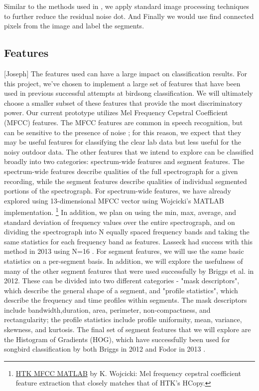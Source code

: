 \documentclass{article} %
\begin{document}
Similar to the methods used in \cite{Lasseck13}, we apply standard image processing techniques to further reduce the residual noise dot. And Finally we would use find connected pixels from the image and label the segments.

\subsection{Features}

[Joseph]  The features used can have a large impact on classification results. For this project, we've chosen to implement a
large set of features that have been used in previous successful attempts at birdsong classification. We will ultimately
choose a smaller subset of these features that provide the most discriminatory power. 
  Our current prototype utilizes Mel Frequency Cepstral Coefficient (MFCC) features. The MFCC features are common in
speech recognition, but can be sensitive to the presence of noise \cite{tyagi2005desensitizing}; for this reason, we expect that they may be
useful features for classifying the clear lab data but less useful for the noisy outdoor data. 
  The other features that we intend to explore can be classified broadly into two categories: spectrum-wide features and
segment features. The spectrum-wide features describe qualities of the full spectrograph for a given recording, while
the segment features describe qualities of individual segmented portions of the spectrograph.
  For spectrum-wide features, we have already explored using 13-dimensional MFCC vector using Wojcicki's MATLAB
implementation. \footnote{\scriptsize \href{http://www.mathworks.com/matlabcentral/fileexchange/32849-htk-mfcc-matlab/content/mfcc/mfcc.m}{HTK MFCC MATLAB} by K. Wojcicki: Mel frequency cepstral coefficient feature extraction that closely matches that of HTK's HCopy.} In addition, we plan on using the min, max, average, and standard deviation of frequency values over
the entire spectrograph, and on dividing the spectrograph into N equally spaced frequency bands and taking the same
statistics for each frequency band as features. Lasseck had success with this method in 2013 using N=16 \cite{Lasseck13}.
  For segment features, we will use the same basic statistics on a per-segment basis. In addition, we will explore the
usefulness of many of the other segment features that were used successfully by Briggs et al. in 2012. These can be divided 
into two different categories - "mask descriptors", which describe the general shape of a segment, and "profile statistics", 
which describe the frequency and time profiles within segments. The mask descriptors include bandwidth,duration, area, 
perimeter, non-compactness, and rectangularity; the profile statistics include profile uniformity, mean, variance,
skewness, and kurtosis. The final set of segment features that we will explore are the Histogram of Gradients (HOG), 
which have successfully been used for songbird classification by both Briggs in 2012 \cite{mlsp1} and Fodor in 2013 \cite{fodor2013ninth}. 
\end{document}

